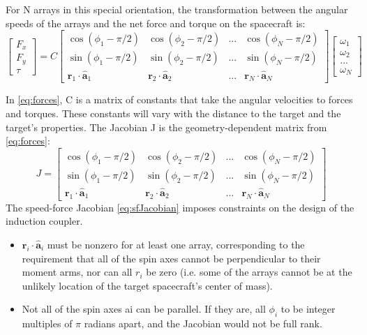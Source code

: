 \documentclass{article}
\begin{document}
For N arrays in this special orientation, the transformation between the angular speeds of the arrays and the net force and torque on the spacecraft is:
\begin{equation}\label{eq:forces}
 \begin{bmatrix} F_x\\F_y\\\tau \end{bmatrix} = C\begin{bmatrix} \cos{(\phi_1 -\pi/2)} & \cos{(\phi_2 -\pi/2)} & ... & \cos{(\phi_N -\pi/2)} \\
\sin{(\phi_1 -\pi/2)} & \sin{(\phi_2 -\pi/2)} & ... & \sin{(\phi_N -\pi/2)} 
\\\textbf{r}_1\cdot \hat{\textbf{a}}_1 & \textbf{r}_2 \cdot \hat{\textbf{a}}_2 & ... & \textbf{r}_N \cdot \hat{\textbf{a}}_N \end{bmatrix}
\begin{bmatrix} \omega_1\\\omega_2\\...\\\omega_N \end{bmatrix}
\end{equation}

In \ref{eq:forces}, C is a matrix of constants that take the angular velocities to forces and torques. These constants will vary with ‎the‎ distance ‎to‎ the ‎target ‎and ‎the ‎target’s‎ properties.
The Jacobian J is the geometry-dependent matrix from \ref{eq:forces}:
\begin{equation}\label{eq:sfJacobian}
J = \begin{bmatrix} \cos{(\phi_1 -\pi/2)} & \cos{(\phi_2 -\pi/2)} & ... & \cos{(\phi_N -\pi/2)} \\
\sin{(\phi_1 -\pi/2)} & \sin{(\phi_2 -\pi/2)} & ... & \sin{(\phi_N -\pi/2)} 
\\\textbf{r}_1\cdot \hat{\textbf{a}}_1 & \textbf{r}_2 \cdot \hat{\textbf{a}}_2 & ... & \textbf{r}_N \cdot \hat{\textbf{a}}_N \end{bmatrix} 
\end{equation}
The speed-force Jacobian \ref{eq:sfJacobian}  imposes constraints on the design of the induction coupler.

\begin{itemize}
\item  $ \textbf{r}_i \cdot \hat{\textbf{a}}_i $ must be nonzero for at least one array, corresponding to the requirement that all of the spin axes cannot be perpendicular to their moment arms, nor can all $r_i$ be zero (i.e. some of the arrays cannot be at the unlikely location of the target spacecraft's center of mass).
\item  Not all of the spin axes ai can be parallel. If they are, all $\phi_i$ to be integer multiples of $\pi$ radians ‎apart, and the Jacobian would not be full rank.
\end{itemize}
\end{document}
